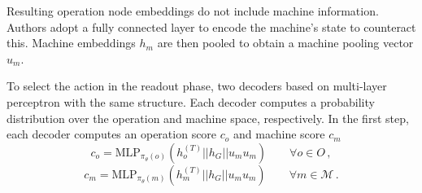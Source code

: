 \par
Resulting operation node embeddings do not include machine information. Authors adopt a fully connected layer to encode the machine's state to counteract this. Machine embeddings $h_m$ are then pooled to obtain a machine pooling vector $u_m$. 
\par
To select the action in the readout phase, two decoders based on multi-layer perceptron with the same structure. Each decoder computes a probability distribution over the operation and machine space, respectively. In the first step, each decoder computes an operation score $c_o$ and machine score $c_m$ \cite{LEI2022117796}
\begin{equation}
    c_o = \text{MLP}_{\pi_{\theta}(o)} \left ( h_o^{(T)} || h_G || u_m u_m \right ) \hspace{2em} \forall o \in O \, ,
\end{equation}
\begin{equation}
    c_m = \text{MLP}_{\pi_{\theta}(m)} \left ( h_m^{(T)} || h_G || u_m u_m \right ) \hspace{2em} \forall m \in \mathcal{M} \, .
\end{equation}
